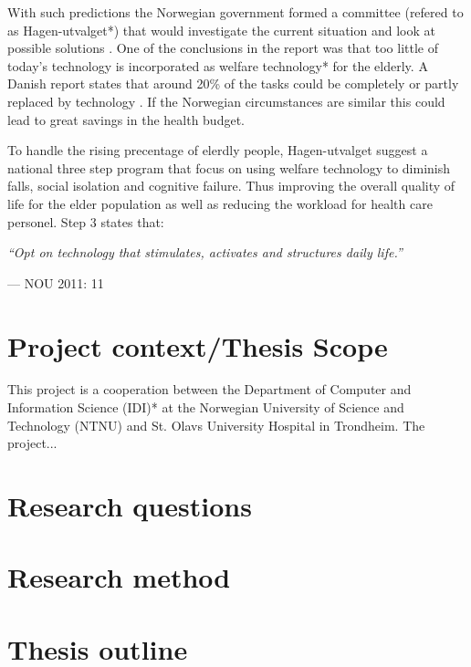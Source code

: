 With such predictions the Norwegian government formed a committee (refered to as Hagen-utvalget*) that would investigate the current situation and look at possible solutions \cite{haagen}. 
One of the conclusions in the report was that too little of today's technology is incorporated as welfare technology* for the elderly.
A Danish report states that around 20\% of the tasks could be completely or partly replaced by technology \cite{kmd}. 
If the Norwegian circumstances are similar this could lead to great savings in the health budget.

To handle the rising precentage of elerdly people, Hagen-utvalget suggest a national three step program that focus on using welfare technology to diminish falls, social isolation and cognitive failure. Thus improving the overall quality of life for the elder population as well as reducing the workload for health care personel. 
Step 3 states that:
\epigraph{\textit{``Opt on technology that stimulates, activates and structures daily life.''}}{--- \textup{NOU 2011: 11}}

\section{Project context/Thesis Scope}
This project is a cooperation between the Department of Computer and Information Science (IDI)* at the Norwegian University of Science and Technology (NTNU) and St. Olavs University Hospital in Trondheim. The project...

\section{Research questions}

\section{Research method}

\section{Thesis outline}
